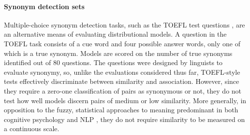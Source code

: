 \paragraph{\bf Synonym detection sets} Multiple-choice synonym detection tasks, such as the TOEFL test questions \cite{landauer1997solution}, are an alternative means of evaluating distributional models. A question in the TOEFL task consists of a cue word and four possible answer words, only one of which is a true synonym. Models are scored on the number of true synonyms identified out of 80 questions. The questions were designed by linguists to evaluate synonymy, so, unlike the evaluations considered thus far, TOEFL-style tests effectively discriminate between similarity and association. However, since they require a zero-one classification of pairs as synonymous or not, they do not test how well models discern pairs of medium or low similarity. More generally, in opposition to the  fuzzy, statistical approaches to meaning predominant in both cognitive psychology \cite{griffiths2007topics} and NLP \cite{turney2010frequency}, they do not require similarity to be measured on a continuous scale.


